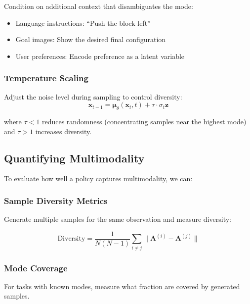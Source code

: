 Condition on additional context that disambiguates the mode:
\begin{itemize}
    \item Language instructions: ``Push the block left''
    \item Goal images: Show the desired final configuration
    \item User preferences: Encode preference as a latent variable
\end{itemize}

\subsubsection{Temperature Scaling}

Adjust the noise level during sampling to control diversity:
\begin{equation}
\mathbf{x}_{t-1} = \boldsymbol{\mu}_\theta(\mathbf{x}_t, t) + \tau \cdot \sigma_t \mathbf{z}
\label{eq:temperature_scaling}
\end{equation}

where $\tau < 1$ reduces randomness (concentrating samples near the highest mode) and $\tau > 1$ increases diversity.

\subsection{Quantifying Multimodality}
\label{subsec:quantifying_multimodality}

To evaluate how well a policy captures multimodality, we can:

\subsubsection{Sample Diversity Metrics}

Generate multiple samples for the same observation and measure diversity:

\begin{equation}
\text{Diversity} = \frac{1}{N(N-1)} \sum_{i \neq j} \|\mathbf{A}^{(i)} - \mathbf{A}^{(j)}\|
\label{eq:sample_diversity}
\end{equation}

\subsubsection{Mode Coverage}

For tasks with known modes, measure what fraction are covered by generated samples.

